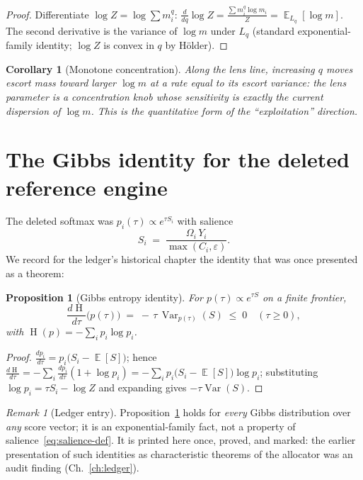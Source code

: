 \documentclass[12pt,oneside]{report}
\theoremstyle{plain}
\newtheorem{proposition}[theorem]{Proposition}
\newtheorem{corollary}[theorem]{Corollary}
\theoremstyle{definition}
\theoremstyle{remark}
\newtheorem{remarkx}[theorem]{Remark}
\newcommand{\E}{\operatorname*{\mathbb{E}}}
\newcommand{\Var}{\operatorname{Var}}
\newcommand{\Ent}{\operatorname{H}}
\newcommand{\escort}[1]{L_{#1}}
\begin{document}
\begin{proof}
Differentiate $\log Z = \log\sum m_i^q$:
$\frac{d}{dq}\log Z = \frac{\sum m_i^q\log m_i}{Z} =
\E_{\escort{q}}[\log m]$. The second derivative is the variance of
$\log m$ under $\escort{q}$ (standard exponential-family identity;
$\log Z$ is convex in $q$ by H\"older).
\end{proof}

\begin{corollary}[Monotone concentration]
Along the lens line, increasing $q$ moves escort mass toward larger
$\log m$ at a rate equal to its escort variance: the lens parameter is
a concentration knob whose sensitivity is exactly the current
dispersion of $\log m$. This is the quantitative form of the
``exploitation'' direction.
\end{corollary}

\section{The Gibbs identity for the deleted reference engine}

The deleted softmax was $p_i(\tau)\propto e^{\tau S_i}$ with salience
\begin{equation}
S_i \;=\; \frac{\Omega_i\,Y_i}{\max(C_i,\varepsilon)}.
\label{eq:salience-def}
\end{equation}
We record for the ledger's historical chapter the identity that was
once presented as a theorem:

\begin{proposition}[Gibbs entropy identity]
\label{prop:gibbs}
For $p(\tau)\propto e^{\tau S}$ on a finite frontier,
\begin{equation}
\frac{d\Ent}{d\tau}\bigl(p(\tau)\bigr) \;=\; -\,\tau\,
\Var_{p(\tau)}(S) \;\le\; 0 \quad (\tau\ge 0),
\end{equation}
with $\Ent(p)=-\sum_ip_i\log p_i$.
\end{proposition}

\begin{proof}
$\frac{dp_i}{d\tau}=p_i\bigl(S_i-\E[S]\bigr)$; hence
$\frac{d\Ent}{d\tau} = -\sum_i \frac{dp_i}{d\tau}(1+\log p_i) =
-\sum_i p_i\bigl(S_i-\E[S]\bigr)\log p_i$; substituting
$\log p_i = \tau S_i - \log Z$ and expanding gives
$-\tau\Var(S)$.
\end{proof}

\begin{remarkx}[Ledger entry]
Proposition~\ref{prop:gibbs} holds for \emph{every} Gibbs distribution
over \emph{any} score vector; it is an exponential-family fact, not a
property of salience~\eqref{eq:salience-def}. It is printed here once,
proved, and marked: the earlier presentation of such identities as
characteristic theorems of the allocator was an audit finding
(Ch.~\ref{ch:ledger}).
\end{remarkx}
\end{document}

